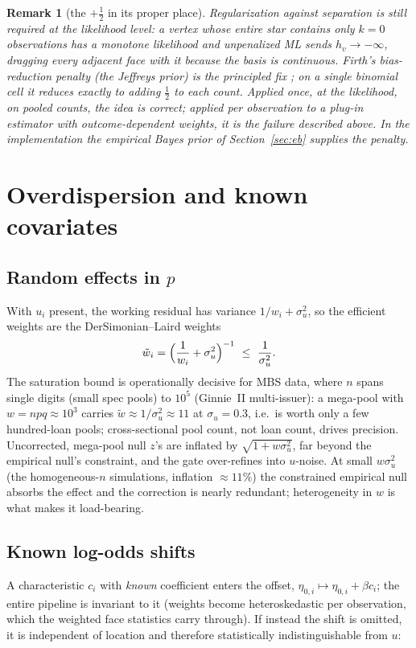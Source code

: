 \documentclass[11pt]{article}
\newtheorem{remark}[proposition]{Remark}
\begin{document}
\begin{remark}[the $+\tfrac12$ in its proper place]
Regularization against separation is still required at the \emph{likelihood} level: a
vertex whose entire star contains only $k=0$ observations has a monotone likelihood and
unpenalized ML sends $h_v\to-\infty$, dragging every adjacent face with it because the
basis is continuous. Firth's bias-reduction penalty (the Jeffreys prior) is the
principled fix \cite{firth1993}; on a single binomial cell it reduces exactly to adding
$\tfrac12$ to each count. Applied once, at the likelihood, on pooled counts, the idea is
correct; applied per observation to a plug-in estimator with outcome-dependent weights,
it is the failure described above. In the implementation the empirical Bayes prior of
Section~\ref{sec:eb} supplies the penalty.
\end{remark}

\section{Overdispersion and known covariates}\label{sec:overdisp}

\subsection{Random effects in $p$}
With $u_i$ present, the working residual has variance $1/w_i+\sigma_u^2$, so the
efficient weights are the DerSimonian--Laird weights
\begin{equation}\label{eq:dlw}
\tilde w_i=\Bigl(\frac{1}{w_i}+\sigma_u^2\Bigr)^{-1}\ \le\ \frac{1}{\sigma_u^2}.
\end{equation}
The saturation bound is operationally decisive for MBS data, where $n$ spans single
digits (small spec pools) to $10^5$ (Ginnie~II multi-issuer): a mega-pool with
$w=npq\approx 10^3$ carries $\tilde w\approx 1/\sigma_u^2\approx 11$ at
$\sigma_u=0.3$, i.e.\ is worth only a few hundred-loan pools; cross-sectional pool
count, not loan count, drives precision. Uncorrected, mega-pool null $z$'s are inflated
by $\sqrt{1+w\sigma_u^2}$, far beyond the empirical null's constraint, and the gate
over-refines into $u$-noise. At small $w\sigma_u^2$ (the homogeneous-$n$ simulations,
inflation $\approx 11\%$) the constrained empirical null absorbs the effect and the
correction is nearly redundant; heterogeneity in $w$ is what makes it load-bearing.

\subsection{Known log-odds shifts}
A characteristic $c_i$ with \emph{known} coefficient enters the offset,
$\eta_{0,i}\mapsto\eta_{0,i}+\beta c_i$; the entire pipeline is invariant to it (weights
become heteroskedastic per observation, which the weighted face statistics carry
through). If instead the shift is omitted, it is independent of location and therefore
statistically indistinguishable from $u$:
\end{document}
